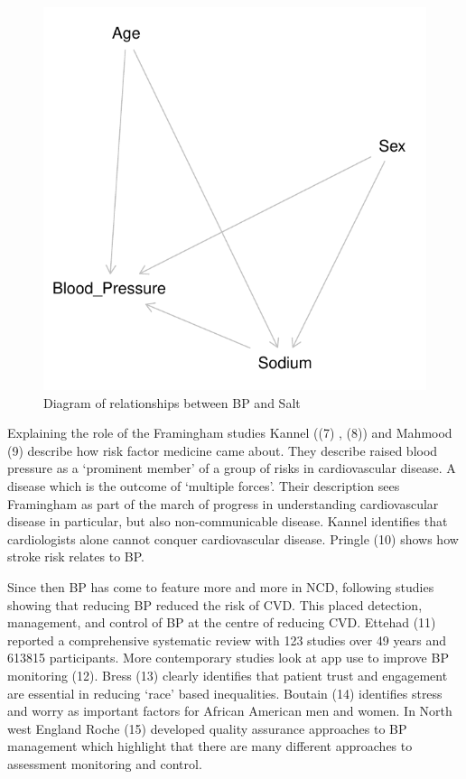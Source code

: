 \documentclass[
]{article}
\begin{document}
\begin{figure}
\centering
\includegraphics{nextlevel_files/figure-latex/fig-dagNa-1.pdf}
\caption{Diagram of relationships between BP and Salt}
\end{figure}

Explaining the role of the Framingham studies Kannel ((7) , (8)) and
Mahmood (9) describe how risk factor medicine came about. They describe
raised blood pressure as a `prominent member' of a group of risks in
cardiovascular disease. A disease which is the outcome of `multiple
forces'. Their description sees Framingham as part of the march of
progress in understanding cardiovascular disease in particular, but also
non-communicable disease. Kannel identifies that cardiologists alone
cannot conquer cardiovascular disease. Pringle (10) shows how stroke
risk relates to BP.

Since then BP has come to feature more and more in NCD, following
studies showing that reducing BP reduced the risk of CVD. This placed
detection, management, and control of BP at the centre of reducing CVD.
Ettehad (11) reported a comprehensive systematic review with 123 studies
over 49 years and 613815 participants. More contemporary studies look at
app use to improve BP monitoring (12). Bress (13) clearly identifies
that patient trust and engagement are essential in reducing `race' based
inequalities. Boutain (14) identifies stress and worry as important
factors for African American men and women. In North west England Roche
(15) developed quality assurance approaches to BP management which
highlight that there are many different approaches to assessment
monitoring and control.
\end{document}
